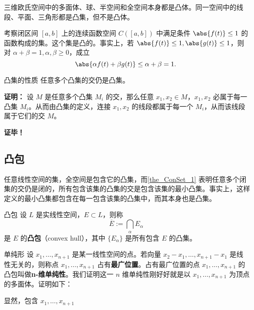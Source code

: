 \begin{example}{}
三维欧氏空间中的多面体、球、半空间和全空间本身都是凸体。同一空间中的线段、平面、三角形都是凸集，但不是凸体。
\end{example}

\begin{example}{}
考察闭区间 $[a,b]$ 上的连续函数空间 $C([a,b])$ 中满足条件 $\abs{f(t)}\leq1$ 的函数构成的集。这个集是凸的。事实上，若 $\abs{f(t)}\leq1,\abs{g(t)}\leq1$，则对 $\alpha+\beta=1,\alpha,\beta\geq0$，成立
\begin{equation}
\abs{\alpha f(t)+\beta g(t)}\leq\alpha+\beta=1.~
\end{equation}

\end{example}




\begin{theorem}{凸集的性质}\label{the_ConSet_1}
任意多个凸集的交仍是凸集。
\end{theorem}
\textbf{证明：} 设 $M$ 是任意多个凸集 $M_i$ 的交，那么任意 $x_1,x_2\in M$，$x_1,x_2$ 必属于每一凸集 $M_i$。从而由凸集的定义，连接 $x_1,x_2$ 的线段都属于每一个 $M_i$，从而该线段属于它们的交 $M$。

\textbf{证毕！} 

\subsection{凸包}
任意线性空间的集，全空间是包含它的凸集，而\autoref{the_ConSet_1} 表明任意多个闭集的交仍是闭的，所有包含该集的凸集的交是包含该集的最小凸集。事实上，这样定义的最小凸集都包含在每一包含该集的凸集中，而其本身也是凸集。
\begin{definition}{凸包}
设 $L$ 是实线性空间，$E\subset L$，则称
\begin{equation}
\overline{E}:=\bigcap_{\alpha}E_\alpha~
\end{equation}
是 $E$ 的\textbf{凸包}（convex hull），其中 $\{E_\alpha\}$ 是所有包含 $E$ 的凸集。
\end{definition}

\begin{example}{单纯形}
设 $x_1,\ldots,x_{n+1}$ 是某一线性空间的点。若向量 $x_2-x_1,\ldots,x_{n+1}-x_1$ 是线性无关的，则称点 $x_1,\ldots,x_{n+1}$ 占有\textbf{最广位置}。占有最广位置的点 $x_1,\ldots,x_{n+1}$ 的凸包叫做\textbf{n-维单纯性}。我们证明这一 $n$ 维单纯性刚好好就是以 $x_1,\ldots,x_{n+1}$ 为顶点的多面体。证明如下：

显然，包含 $x_1,\ldots,x_{n+1}$ 

\end{example}





















